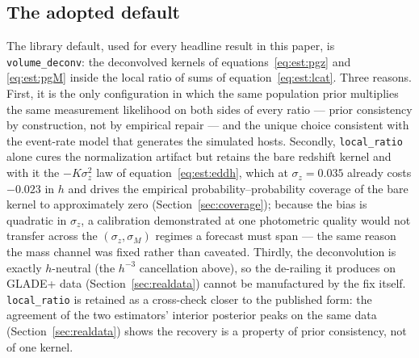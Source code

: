 \subsection{The adopted default}
\label{sec:est:default}

The library default, used for every headline result in this paper, is \texttt{volume\_deconv}: the deconvolved kernels of equations~\eqref{eq:est:pgz} and \eqref{eq:est:pgM} inside the local ratio of sums of equation~\eqref{eq:est:lcat}. Three reasons. First, it is the only configuration in which the same population prior multiplies the same measurement likelihood on both sides of every ratio --- prior consistency by construction, not by empirical repair --- and the unique choice consistent with the event-rate model that generates the simulated hosts. Secondly, \texttt{local\_ratio} alone cures the normalization artifact but retains the bare redshift kernel and with it the $-K\sigma_z^2$ law of equation~\eqref{eq:est:eddh}, which at $\sigma_z = 0.035$ already costs $-0.023$ in $h$ %
and drives the empirical probability--probability coverage of the bare kernel to approximately zero (Section~\ref{sec:coverage}); %
because the bias is quadratic in $\sigma_z$, a calibration demonstrated at one photometric quality would not transfer across the $(\sigma_z, \sigma_M)$ regimes a forecast must span --- the same reason the mass channel was fixed rather than caveated. Thirdly, the deconvolution is exactly $h$-neutral (the $h^{-3}$ cancellation above), so the de-railing it produces on GLADE+ data (Section~\ref{sec:realdata}) cannot be manufactured by the fix itself. \texttt{local\_ratio} is retained as a cross-check closer to the published form: the agreement of the two estimators' interior posterior peaks on the same data (Section~\ref{sec:realdata}) shows the recovery is a property of prior consistency, not of one kernel.
